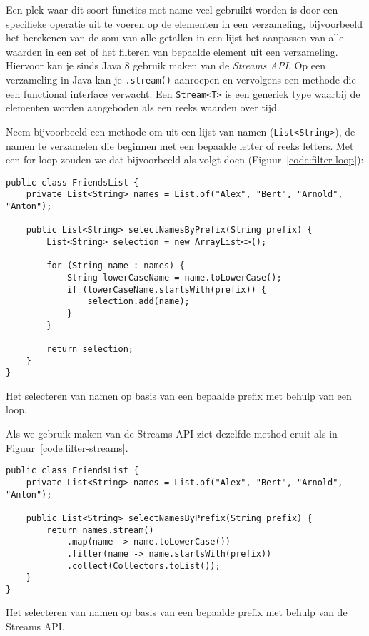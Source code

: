 Een plek waar dit soort functies met name veel gebruikt worden is door een 
specifieke operatie uit te voeren op de elementen in een verzameling, bijvoorbeeld
het berekenen van de som van alle getallen in een lijst 
het aanpassen van alle waarden in een set of 
het filteren van bepaalde element uit een verzameling.
Hiervoor kan je sinds Java 8 gebruik maken van de \textit{Streams API}.
Op een verzameling in Java kan je \texttt{.stream()} aanroepen en vervolgens 
een methode die een functional interface verwacht. Een \texttt{Stream<T>} is 
een generiek type waarbij de elementen worden aangeboden als een reeks waarden over tijd.

Neem bijvoorbeeld een methode om uit een lijst van namen (\texttt{List<String>}),
de namen te verzamelen die beginnen met een bepaalde letter of reeks letters.
Met een for-loop zouden we dat bijvoorbeeld als volgt doen (Figuur~\ref{code:filter-loop}):

\begin{listing}[H]
\begin{verbatim}
public class FriendsList {
    private List<String> names = List.of("Alex", "Bert", "Arnold", "Anton");

    public List<String> selectNamesByPrefix(String prefix) {
        List<String> selection = new ArrayList<>();

        for (String name : names) {
            String lowerCaseName = name.toLowerCase();
            if (lowerCaseName.startsWith(prefix)) {
                selection.add(name);
            }
        }

        return selection;
    }
}
\end{verbatim}
\caption{Het selecteren van namen op basis van een bepaalde prefix met behulp van een loop.}
\label{code:filter-loop}
\end{listing}

Als we gebruik maken van de Streams API ziet dezelfde method eruit als in Figuur~\ref{code:filter-streams}.

\begin{listing}[H]
\begin{verbatim}
public class FriendsList {
    private List<String> names = List.of("Alex", "Bert", "Arnold", "Anton");

    public List<String> selectNamesByPrefix(String prefix) {
        return names.stream()
            .map(name -> name.toLowerCase())
            .filter(name -> name.startsWith(prefix))
            .collect(Collectors.toList());
    }
}
\end{verbatim}
\caption{Het selecteren van namen op basis van een bepaalde prefix met behulp van de Streams API.}
\label{code:filter-loop}
\end{listing}

